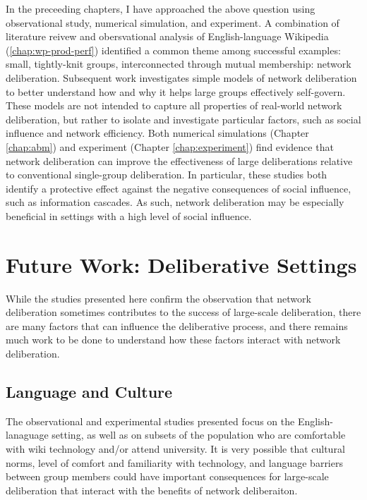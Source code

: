 In the preceeding chapters, I have approached the above question using observational study, numerical simulation, and experiment.
A combination of literature reivew and obersvational analysis of English-language Wikipedia (\ref{chap:wp-prod-perf}) identified a common theme among successful examples: small, tightly-knit groups, interconnected through mutual membership: network deliberation.
Subsequent work investigates simple models of network deliberation to better understand how and why it helps large groups effectively self-govern.
These models are not intended to capture all properties of real-world network deliberation, but rather to isolate and investigate particular factors, such as social influence and network efficiency.
Both numerical simulations (Chapter \ref{chap:abm}) and experiment (Chapter \ref{chap:experiment}) find evidence that network deliberation can improve the effectiveness of large deliberations relative to conventional single-group deliberation.
In particular, these studies both identify a protective effect against the negative consequences of social influence, such as information cascades.
As such, network deliberation may be especially beneficial in settings with a high level of social influence.

\section{Future Work: Deliberative Settings}
While the studies presented here confirm the observation that network deliberation sometimes contributes to the success of large-scale deliberation, there are many factors that can influence the deliberative process, and there remains much work to be done to understand how these factors interact with network deliberation.

\subsection{Language and Culture}
The observational and experimental studies presented focus on the English-lanaguage setting, as well as on subsets of the population who are comfortable with wiki technology and/or attend university.
It is very possible that cultural norms, level of comfort and familiarity with technology, and language barriers between group members could have important consequences for large-scale deliberation that interact with the benefits of network deliberaiton.

